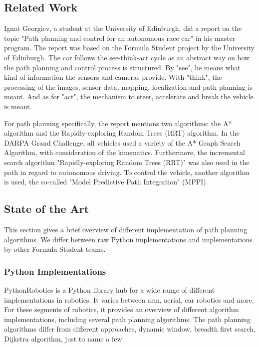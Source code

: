 \subsection{Related Work}

Ignat Georgiev, a student at the University of Edinburgh, did a report on the topic "Path planning and control for an autonomous race car" in his master program. The report was based on the Formula Student project by the University of Edinburgh. The car follows the see-think-act cycle as an abstract way on how the path planning and control process is structured. By "see", he means what kind of information the sensors and cameras provide. With "think", the processing of the images, sensor data, mapping, localization and path planning is meant. And as for "act", the mechanism to steer, accelerate and break the vehicle is meant.

For path planning specifically, the report mentions two algorithms: the A* algorithm and the Rapidly-exploring Random Trees (RRT) algorithm. In the DARPA Grand Challenge, all vehicles used a variety of the A* Graph Search Algorithm, with consideration of the kinematics. Furthermore, the incremental search algorithm "Rapidly-exploring Random Trees (RRT)" was also used in the path in regard to autonomous driving.
To control the vehicle, another algorithm is used, the so-called "Model Predictive Path Integration" (MPPI).
\cite{path_planning_and_control_georgiev}

\subsection{State of the Art}
This section gives a brief overview of different implementation of path planning algorithms. We differ between raw Python implementations and implementations by other Formula Student teams.

\subsubsection{Python Implementations}
PythonRobotics is a Python library hub for a wide range of different implementations in robotics. It varies between arm, aerial, car robotics and more.
For these segments of robotics, it provides an overview of different algorithm implementations, including several path planning algorithms.
The path planning algorithms differ from different approaches, dynamic window, breadth first search, Dijkstra algorithm, just to name a few. 
\cite{python_robotics}

